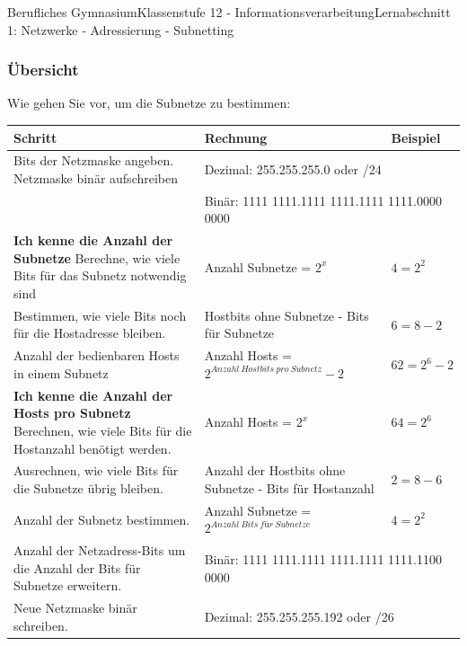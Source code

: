 \documentclass[11pt,oneside,openany,headings=optiontotoc,11pt,numbers=noenddot]{article}
\begin{document}
\begin{worksheet}{Berufliches Gymnasium}{Klassenstufe 12 - Informationsverarbeitung}{Lernabschnitt 1: Netzwerke - Adressierung - Subnetting}
		\subsubsection*{Übersicht}
		Wie gehen Sie vor, um die Subnetze zu bestimmen:\\
		\par\noindent
		\begin{tabularx}{\textwidth}{|X|X|l|}
			\hline
			\rowcolor{gray!15}\textbf{Schritt} & \textbf{Rechnung} & \textbf{Beispiel}\\
			\hline
			Bits der Netzmaske angeben. Netzmaske binär aufschreiben & \multicolumn{2}{l|}{\footnotesize{Dezimal: 255.255.255.0 oder /24}}\\
			& \multicolumn{2}{l|}{\footnotesize{Binär: 1111 1111.1111 1111.1111 1111.0000 0000}}\\
			\hline
			\hline
			\textbf{Ich kenne die Anzahl der Subnetze} Berechne, wie viele Bits für das Subnetz notwendig sind & \footnotesize{Anzahl Subnetze =} \(2^x\) & \(4 = 2^2\)\\
			\hline
			Bestimmen, wie viele Bits noch für die Hostadresse bleiben. &\footnotesize{Hostbits ohne Subnetze - Bits für Subnetze} & \(6 = 8-2\)\\
			\hline
			Anzahl der bedienbaren Hosts in einem Subnetz & \footnotesize{Anzahl Hosts =} \(2^{Anzahl\ Hostbits\ pro\ Subnetz} - 2 \) & \(62 = 2^6 - 2\)\\
			\hline
			\hline
			\textbf{Ich kenne die Anzahl der Hosts pro Subnetz} Berechnen, wie viele Bits für die Hostanzahl benötigt werden. & \footnotesize{Anzahl Hosts =} \(2^x\) & \(64 = 2^6\)\\
			\hline
			Ausrechnen, wie viele Bits für die Subnetze übrig bleiben. & \footnotesize{Anzahl der Hostbits ohne Subnetze - Bits für Hostanzahl} & \(2 = 8 - 6\)\\
			\hline
			Anzahl der Subnetz bestimmen. & \footnotesize{Anzahl Subnetze =} \(2^{Anzahl\ Bits\ für\ Subnetze}\) & \(4 = 2^2\)\\
			\hline
			\hline
			Anzahl der Netzadress-Bits um die Anzahl der Bits für Subnetze erweitern. & \multicolumn{2}{l|}{\footnotesize{Binär: 1111 1111.1111 1111.1111 1111.1100 0000}}\\
			Neue Netzmaske binär schreiben. & \multicolumn{2}{l|}{\footnotesize{Dezimal: 255.255.255.192 oder /26}}\\
			\hline
		\end{tabularx}
	\end{worksheet}
\end{document}
